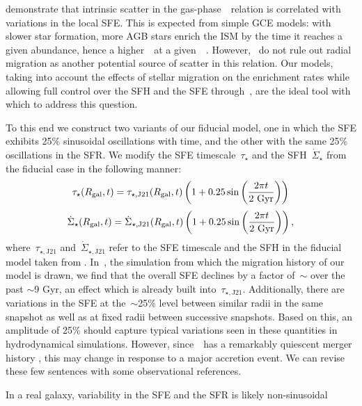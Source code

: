 \documentclass[ms.tex]{subfiles}
\begin{document}
\citet{Schaefer2020} demonstrate that intrinsic scatter in the
gas-phase~\ohno~relation is correlated with variations in the local SFE.
This is expected from simple GCE models: with slower star formation, more AGB
stars enrich the ISM by the time it reaches a given abundance, hence a
higher~\no~at a given~\oh~\citep[e.g.][]{Molla2006, Vincenzo2016a}.
However,~\citet{Schaefer2020} do not rule out radial migration as another
potential source of scatter in this relation.
Our models, taking into account the effects of stellar migration on the
enrichment rates while allowing full control over the SFH and the SFE
through~\vice, are the ideal tool with which to address this question.
\par
To this end we construct two variants of our fiducial model, one in which the
SFE exhibits 25\% sinusoidal oscillations with time, and the other with the
same 25\% oscillations in the SFR.
We modify the SFE timescale~$\tau_\star$ and the SFH~$\dot{\Sigma}_\star$ from
the fiducial case in the following manner:
\begin{equation}
\tau_\star(R_\text{gal}, t) = \tau_{\star,\text{J21}}(R_\text{gal}, t)
\left(1 + 0.25\sin\left(\frac{2\pi t}{2~\text{Gyr}}\right)\right)
\label{eq:sfe_var}
\end{equation}
\begin{equation}
\dot{\Sigma}_\star(R_\text{gal}, t) = \dot{\Sigma}_{\star,\text{J21}}(R_\text{gal}, t)
\left(1 + 0.25\sin\left(\frac{2\pi t}{2~\text{Gyr}}\right)\right),
\label{eq:sfr_var}
\end{equation}
where~$\tau_{\star,\text{J21}}$ and~$\dot{\Sigma}_{\star,\text{J21}}$ refer to
the SFE timescale and the SFH in the fiducial model taken from
\citet{Johnson2021}.
In~\hsim, the simulation from which the migration history of our model is drawn,
we find that the overall SFE declines by a factor of~$\sim$ over the past
$\sim$9 Gyr, an effect which is already built into~$\tau_{\star,\text{J21}}$.
Additionally, there are variations in the SFE at the~$\sim$25\% level between
similar radii in the same snapshot as well as at fixed radii between successive
snapshots.
Based on this, an amplitude of 25\% should capture typical variations seen in
these quantities in hydrodynamical simulations.
However, since~\hsim~has a remarkably quiescent merger history
\citep{Zolotov2012}, this may change in response to a major accretion event.
{\color{red} We can revise these few sentences with some observational
references.}
\par
In a real galaxy, variability in the SFE and the SFR is likely non-sinusoidal
\end{document}
